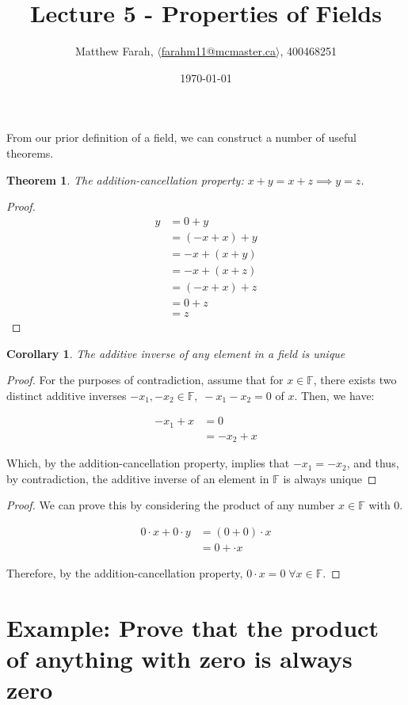 \documentclass{article}
\title{Lecture 5 - Properties of Fields}
\author{Matthew Farah, \href{mailto:farahm11@mcmaster.ca}{$\langle$farahm11@mcmaster.ca$\rangle$}, 400468251}
\date{\today}
\newtheorem{theorem}{Theorem}
\newtheorem{corollary}{Corollary}[theorem]
\begin{document}
\maketitle
\pagestyle{fancy}

From our prior definition of a field, we can construct a number of useful theorems.

\begin{theorem}
	The addition-cancellation property: $x + y = x + z \implies y = z$.
\end{theorem}

\begin{proof}
	\begin{align*}
		y &= 0 + y\\
		&= (-x + x) + y \\
		&= -x + (x + y) \\
		&= -x + (x + z) \\
		&= (-x + x) + z \\
		&= 0 + z \\
		&= z
	\end{align*}
\end{proof}

\begin{corollary}
	The additive inverse of any element in a field is unique
\end{corollary}

\begin{proof}
	For the purposes of contradiction, assume that for $x \in \mathbb{F}$, there exists two distinct additive inverses $-x_1, -x_2 \in \mathbb{F}, \; -x_1 -x_2 = 0$ of $x$. Then, we have:
	
	\begin{align*}
		-x_1 + x &= 0 \\
		&= -x_2 + x
	\end{align*}

	Which, by the addition-cancellation property, implies that $-x_1 = -x_2$, and thus, by contradiction, the additive inverse of an element in $\mathbb{F}$ is always unique
\end{proof}

\begin{proof}
	We can prove this by considering the product of any number $x \in \mathbb{F}$ with 0.

	\begin{align*}
		0 \cdot x + 0 \cdot y &= (0 + 0) \cdot x \\
		&= 0 + \cdot x
	\end{align*}

	Therefore, by the addition-cancellation property, $0 \cdot x = 0 \; \forall x \in \mathbb{F}$.
\end{proof}

\section[Ex. ~\thesection]{Example: Prove that the product of anything with zero is always zero}
\end{document}
